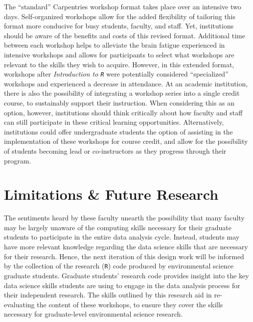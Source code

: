 \documentclass[12pt]{article}
\begin{document}
\quad The ``standard'' Carpentries workshop format takes place over an 
intensive two days. Self-organized workshops allow for the added flexibility of 
tailoring this format more conducive for busy students, faculty, and staff.
Yet, institutions should be aware of the benefits and costs of this 
revised format. Additional time between each workshop helps to alleviate the
brain fatigue experienced in intensive workshops and allows for participants to 
select what workshops are relevant to the skills they wish to acquire. However, 
in this extended format, workshops after \emph{Introduction to \texttt{R}} 
were potentially considered ``specialized'' workshops and experienced a 
decrease in attendance. At an academic institution, there is also the
possibility of integrating a workshop series into a single credit course, to 
sustainably support their instruction. When considering this as an option, 
however, institutions should think critically about how faculty and staff can 
still participate in these critical learning opportunities. Alternatively,
institutions could offer undergraduate students the option of assisting in the 
implementation of these workshops for course credit, and allow for the
possibility of students becoming lead or co-instructors as they progress through
their program. 

\section{Limitations \& Future Research} 
\label{sec:future}

\quad The sentiments heard by these faculty unearth the possibility that many
faculty may be largely unaware of the computing skills necessary for their 
graduate students to participate in the entire data analysis cycle. Instead, 
students may have more relevant knowledge regarding the data science skills that
are necessary for their research. Hence, the next iteration of this design work
will be informed by the collection of the research (\texttt{R}) code produced by
environmental science graduate students. Graduate students' research code
provides insight into the key data science skills students are using to engage 
in the data analysis process for their independent research. The skills outlined
by this research aid in re-evaluating the content of these workshops, to ensure
they cover the skills necessary for graduate-level environmental science
research. 
\end{document}
